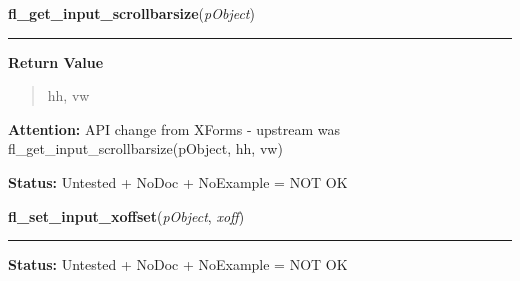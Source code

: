     \label{xformslib:library:fl_get_input_scrollbarsize}

    \vspace{0.5ex}

\hspace{.8\funcindent}\begin{boxedminipage}{\funcwidth}

    \raggedright \textbf{fl\_get\_input\_scrollbarsize}(\textit{pObject})

    \vspace{-1.5ex}

    \rule{\textwidth}{0.5\fboxrule}
\setlength{\parskip}{2ex}
\setlength{\parskip}{1ex}
      \textbf{Return Value}
    \vspace{-1ex}

      \begin{quote}
      hh, vw

      \end{quote}

\textbf{Attention:} API change from XForms - upstream was 
fl\_get\_input\_scrollbarsize(pObject, hh, vw)



\textbf{Status:} Untested + NoDoc + NoExample = NOT OK



    \end{boxedminipage}

    \label{xformslib:library:fl_set_input_xoffset}

    \vspace{0.5ex}

\hspace{.8\funcindent}\begin{boxedminipage}{\funcwidth}

    \raggedright \textbf{fl\_set\_input\_xoffset}(\textit{pObject}, \textit{xoff})

    \vspace{-1.5ex}

    \rule{\textwidth}{0.5\fboxrule}
\setlength{\parskip}{2ex}
\setlength{\parskip}{1ex}
\textbf{Status:} Untested + NoDoc + NoExample = NOT OK



    \end{boxedminipage}

